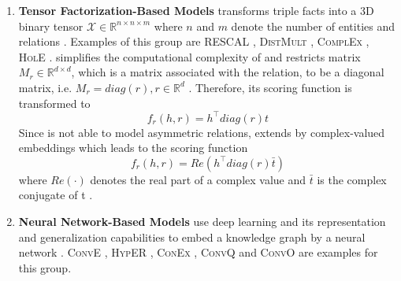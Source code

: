 \begin{enumerate}
    \item 
    \textbf{Tensor Factorization-Based Models} transforms triple facts into a 3D binary tensor $\mathcal{X} \in \mathbb{R}^{n \times n \times m}$ where $n$ and $m$ denote the number of entities and relations \cite{electronics9050750}.
    Examples of this group are \textsc{RESCAL} \cite{RESCAL}, \textsc{DistMult} \cite{DistMult}, \textsc{ComplEx} \cite{ComplEx}, \textsc{HolE} \cite{HolE}.
    \distmult simplifies the computational complexity of \rescal and restricts matrix $M_r \in \mathbb{R}^{d \times d}$, which is a matrix associated with the relation, to be a diagonal matrix, i.e. $M_r = diag(r), r \in \mathbb{R}^d$ \cite{electronics9050750}. 
    Therefore, its scoring function is transformed to
    \begin{equation}
        f_r(h,r) = h^{\top}diag(r)t\label{eq:distmultscoringfunction}
    \end{equation}
    Since \distmult is not able to model asymmetric relations, \complex \cite{ComplEx} extends \distmult by complex-valued embeddings \cite{electronics9050750} which leads to the scoring function
    \begin{equation}
        f_r(h,r) = Re(h^{\top}diag(r)\bar{t})
        \label{eq:complexscoringfunction}
    \end{equation}
    where $Re(\cdot)$ denotes the real part of a complex value and $\bar{t}$ is the complex conjugate of t \cite{electronics9050750}.
    
    \item 
    \textbf{Neural Network-Based Models} use deep learning and its representation and generalization capabilities to embed a knowledge graph by a neural network \cite{electronics9050750}.
    \textsc{ConvE} \cite{ConvE}, \textsc{HypER} \cite{HypER}, \textsc{ConEx} \cite{ConEx}, \textsc{ConvQ} and  \textsc{ConvO} \cite{demir2021convolutional} are examples for this group.
    
\end{enumerate}